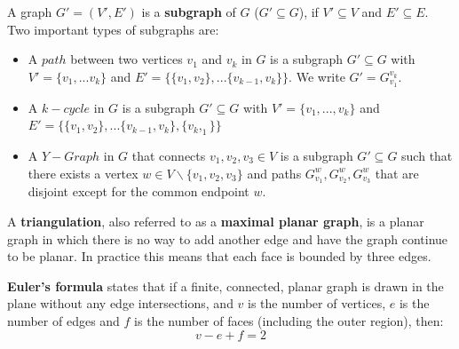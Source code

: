 \documentclass{article}
\begin{document}
  A graph $G' = (V',E')$ is a \textbf{subgraph} of $G$ ($G' \subseteq G$), if $V' \subseteq V$ and $E' \subseteq E$. Two important types of subgraphs are:
  \begin{itemize}
  \item A $path$ between two vertices $v_1$ and $v_k$ in $G$ is a subgraph $G' \subseteq G$ with $V' = \{v_1,...v_k\}$ and $E' 	= \{\{v_1,v_2\},...\{v_{k-1}, v_k\}\}$. We write $G' = G_{v_1}^{v_k}$.
  \item A $k-cycle$ in $G$ is a subgraph $G'\subseteq G$ with $V' = \{v_1,...,v_k\}$ and $E' = \{\{v_1,v_2\},...\{v_{k-1}, v_k\}, \{v_k,_1\}\}$
  \item A $Y-Graph$ in $G$ that connects $v_1,v_2, v_3 \in V$ is a subgraph $G' \subseteq G$ such that there exists a vertex $w \in V \backslash \{v_1,v_2, v_3\}$ and paths $G_{v_1}^w, G_{v_2}^w, G_{v_3}^w$ that are disjoint except for the common endpoint $w$.
  \end{itemize}
  A \textbf{triangulation}, also referred to as a \textbf{maximal planar graph}, is a planar graph in which there is no way to add another edge and have the graph continue to be planar. In practice this means that each face is bounded by three edges\citep{mathworld:Triangulation}.
  
  \textbf{Euler's formula} states that if a finite, connected, planar graph is drawn in the plane without any edge intersections, and $v$ is the number of vertices, $e$ is the number of edges and $f$ is the number of faces (including the outer region), then: 
  \begin{equation} 
	v-e+f=2
  \end{equation}
  
\end{document}
